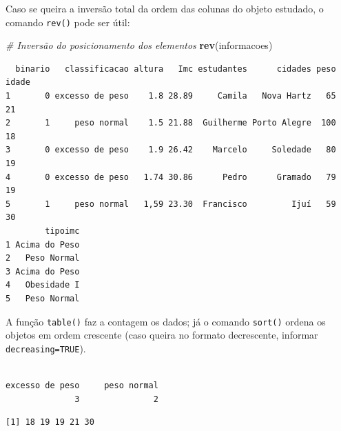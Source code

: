 \documentclass[12pt,brazil,oneside]{book}
\newenvironment{Shaded}{\begin{snugshade}}{\end{snugshade}}
\newcommand{\CommentTok}[1]{\textcolor[rgb]{0.56,0.35,0.01}{\textit{#1}}}
\newcommand{\KeywordTok}[1]{\textcolor[rgb]{0.13,0.29,0.53}{\textbf{#1}}}
\newcommand{\NormalTok}[1]{#1}
\newcommand{\OperatorTok}[1]{\textcolor[rgb]{0.81,0.36,0.00}{\textbf{#1}}}
\begin{document}
Caso se queira a inversão total da ordem das colunas do objeto estudado,
o comando \texttt{rev()} pode ser útil:

\begin{Shaded}
\begin{Highlighting}[]
\CommentTok{# Inversão do posicionamento dos elementos}
\KeywordTok{rev}\NormalTok{(informacoes)}
\end{Highlighting}
\end{Shaded}

\begin{verbatim}
  binario   classificacao altura   Imc estudantes      cidades peso idade
1       0 excesso de peso    1.8 28.89     Camila   Nova Hartz   65    21
2       1     peso normal    1.5 21.88  Guilherme Porto Alegre  100    18
3       0 excesso de peso    1.9 26.42    Marcelo     Soledade   80    19
4       0 excesso de peso   1.74 30.86      Pedro      Gramado   79    19
5       1     peso normal   1,59 23.30  Francisco         Ijuí   59    30
        tipoimc
1 Acima do Peso
2   Peso Normal
3 Acima do Peso
4   Obesidade I
5   Peso Normal
\end{verbatim}

A função \texttt{table()} faz a contagem os dados; já o comando
\texttt{sort()} ordena os objetos em ordem crescente (caso queira no
formato decrescente, informar \texttt{decreasing=TRUE}).

\begin{Shaded}
\end{Shaded}

\begin{verbatim}

excesso de peso     peso normal 
              3               2 
\end{verbatim}

\begin{Shaded}
\end{Shaded}

\begin{verbatim}
[1] 18 19 19 21 30
\end{verbatim}
\end{document}
